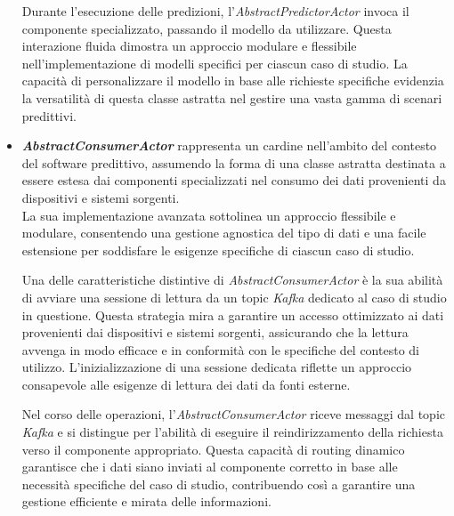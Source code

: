 \begin{itemize}
    Durante l'esecuzione delle predizioni, l'\textit{AbstractPredictorActor} invoca il componente specializzato, passando il modello da utilizzare.
    Questa interazione fluida dimostra un approccio modulare e flessibile nell'implementazione di modelli specifici per ciascun caso di studio.
    La capacità di personalizzare il modello in base alle richieste specifiche evidenzia la versatilità di questa classe astratta nel gestire una vasta gamma di scenari predittivi.
    \item \textit{\textbf{AbstractConsumerActor}} rappresenta un cardine nell'ambito del contesto del software predittivo, assumendo la forma di una classe astratta destinata a essere estesa dai componenti specializzati nel consumo dei dati provenienti da dispositivi e sistemi sorgenti. \\
    La sua implementazione avanzata sottolinea un approccio flessibile e modulare, consentendo una gestione agnostica del tipo di dati e una facile estensione per soddisfare le esigenze specifiche di ciascun caso di studio.

    Una delle caratteristiche distintive di \textit{AbstractConsumerActor} è la sua abilità di avviare una sessione di lettura da un topic \textit{Kafka} dedicato al caso di studio in questione.
    Questa strategia mira a garantire un accesso ottimizzato ai dati provenienti dai dispositivi e sistemi sorgenti, assicurando che la lettura avvenga in modo efficace e in conformità con le specifiche del contesto di utilizzo.
    L'inizializzazione di una sessione dedicata riflette un approccio consapevole alle esigenze di lettura dei dati da fonti esterne. 

    Nel corso delle operazioni, l'\textit{AbstractConsumerActor} riceve messaggi dal topic \textit{Kafka} e si distingue per l'abilità di eseguire il reindirizzamento della richiesta verso il componente appropriato.
    Questa capacità di routing dinamico garantisce che i dati siano inviati al componente corretto in base alle necessità specifiche del caso di studio, contribuendo così a garantire una gestione efficiente e mirata delle informazioni. 


\end{itemize}
